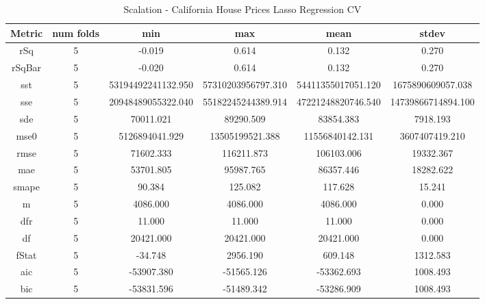 \documentclass{article}
\begin{document}
\begin{table}[H]
\centering
\caption{Scalation - California House Prices Lasso Regression CV}
\label{tab:Scalation - California House Prices Lasso Regression CV}
\begin{tabular}{|c|c|c|c|c|c|}\hline
Metric & num folds & min & max & mean & stdev \\ \hline \hline
rSq & 5 & -0.019 & 0.614 & 0.132 & 0.270 \\ \hline
rSqBar & 5 & -0.020 & 0.614 & 0.132 & 0.270 \\ \hline
sst & 5 & 53194492241132.950 & 57310203956797.310 & 54411355017051.120 & 1675890609057.038 \\ \hline
sse & 5 & 20948489055322.040 & 55182245244389.914 & 47221248820746.540 & 14739866714894.100 \\ \hline
sde & 5 & 70011.021 & 89290.509 & 83854.383 & 7918.193 \\ \hline
mse0 & 5 & 5126894041.929 & 13505199521.388 & 11556840142.131 & 3607407419.210 \\ \hline
rmse & 5 & 71602.333 & 116211.873 & 106103.006 & 19332.367 \\ \hline
mae & 5 & 53701.805 & 95987.765 & 86357.446 & 18282.622 \\ \hline
smape & 5 & 90.384 & 125.082 & 117.628 & 15.241 \\ \hline
m & 5 & 4086.000 & 4086.000 & 4086.000 & 0.000 \\ \hline
dfr & 5 & 11.000 & 11.000 & 11.000 & 0.000 \\ \hline
df & 5 & 20421.000 & 20421.000 & 20421.000 & 0.000 \\ \hline
fStat & 5 & -34.748 & 2956.190 & 609.148 & 1312.583 \\ \hline
aic & 5 & -53907.380 & -51565.126 & -53362.693 & 1008.493 \\ \hline
bic & 5 & -53831.596 & -51489.342 & -53286.909 & 1008.493 \\ \hline
\end{tabular}
\end{table}
\end{document}
